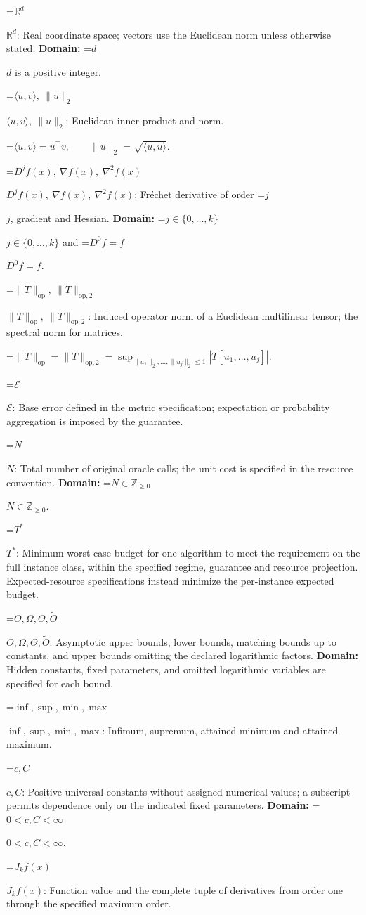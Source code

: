 \documentclass[10pt,a4paper]{article}
\newcommand{\AtlasMath}[1]{\par\begingroup\centering\setbox0=\hbox{$\displaystyle #1$}\ifdim\wd0>1.4\linewidth\typeout{ATLAS WIDE FORMULA: \the\wd0}\fi\ifdim\wd0>\linewidth\resizebox{\linewidth}{!}{\box0}\else\box0\fi\par\endgroup}
\newcommand{\AtlasInlineMath}[1]{\begingroup\setbox0=\hbox{$#1$}\ifdim\wd0>.4\linewidth\endgroup\AtlasMath{#1}\else\endgroup$#1$\fi}
\begin{document}
\AtlasInlineMath{\mathbb{R}^d}: Real coordinate space; vectors use the Euclidean norm unless otherwise stated. \textbf{Domain:} \AtlasInlineMath{d} is a positive integer.

\AtlasInlineMath{\langle u,v\rangle,\ \|u\|_2}: Euclidean inner product and norm.


\AtlasMath{\langle u,v\rangle=u^\top v,\qquad\|u\|_2=\sqrt{\langle u,u\rangle}.}


\AtlasInlineMath{D^jf(x),\ \nabla f(x),\ \nabla^2f(x)}: Fréchet derivative of order \AtlasInlineMath{j}, gradient and Hessian. \textbf{Domain:} \AtlasInlineMath{j\in\{0,\ldots,k\}} and \AtlasInlineMath{D^0f=f}.

\AtlasInlineMath{\|T\|_{\mathrm{op}},\ \|T\|_{\mathrm{op},2}}: Induced operator norm of a Euclidean multilinear tensor; the spectral norm for matrices.


\AtlasMath{\|T\|_{\mathrm{op}}=\|T\|_{\mathrm{op},2}=\sup_{\|u_1\|_2,\ldots,\|u_j\|_2\le1}|T[u_1,\ldots,u_j]|.}


\AtlasInlineMath{\mathcal{E}}: Base error defined in the metric specification; expectation or probability aggregation is imposed by the guarantee.

\AtlasInlineMath{N}: Total number of original oracle calls; the unit cost is specified in the resource convention. \textbf{Domain:} \AtlasInlineMath{N\in\mathbb{Z}_{\ge0}}.

\AtlasInlineMath{T^*}: Minimum worst-case budget for one algorithm to meet the requirement on the full instance class, within the specified regime, guarantee and resource projection. Expected-resource specifications instead minimize the per-instance expected budget.

\AtlasInlineMath{O,\Omega,\Theta,\widetilde{O}}: Asymptotic upper bounds, lower bounds, matching bounds up to constants, and upper bounds omitting the declared logarithmic factors. \textbf{Domain:} Hidden constants, fixed parameters, and omitted logarithmic variables are specified for each bound.

\AtlasInlineMath{\inf,\sup,\min,\max}: Infimum, supremum, attained minimum and attained maximum.

\AtlasInlineMath{c,C}: Positive universal constants without assigned numerical values; a subscript permits dependence only on the indicated fixed parameters. \textbf{Domain:} \AtlasInlineMath{0<c,C<\infty}.

\AtlasInlineMath{J_{k}f(x)}: Function value and the complete tuple of derivatives from order one through the specified maximum order.
\end{document}
